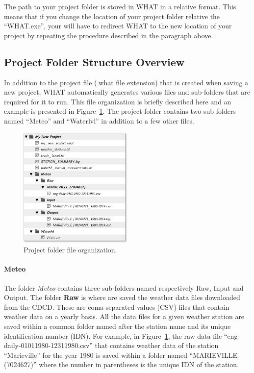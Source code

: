 \documentclass[12pt, letterpaper, fleqn]{report}
\begin{document}
The path to your project folder is stored in WHAT in a relative format. This means that if you change the location of your project folder relative the ``WHAT.exe'', your will have to redirect WHAT to the new location of your project by repeating the procedure described in the paragraph above.

\subsection{Project Folder Structure Overview}\label{subsec:folder_structure}

In addition to the project file (.what file extension) that is created when saving a new project, WHAT automatically generates various files and sub-folders that are required for it to run. This file organization is briefly described here and an example is presented in Figure~\ref{fig:proFolder_organization}. The project folder contains two sub-folders named ``Meteo'' and ``Waterlvl'' in addition to a few other files.

\begin{figure}[h!]
\centering
\includegraphics[width=0.5\textwidth]{file_and_folder_architecture}
\caption[Project folder file organization.]{Project folder file organization.}
\label{fig:proFolder_organization}
\end{figure}

\paragraph{Meteo} The folder \emph{Meteo} contains three sub-folders named respectively Raw, Input and Output. The folder \textbf{Raw} is where are saved the weather data files downloaded from the CDCD. These are coma-separated values (CSV) files that contain weather data on a yearly basis. All the data files for a given weather station are saved within a common folder named after the station name and its unique identification number (IDN). For example, in Figure~\ref{fig:proFolder_organization}, the raw data file ``eng-daily-01011980-12311980.csv'' that contains weather data of the station ``Marieville'' for the year 1980 is saved within a folder named ``MARIEVILLE (7024627)'' where the number in parentheses is the unique IDN of the station.
\end{document}
